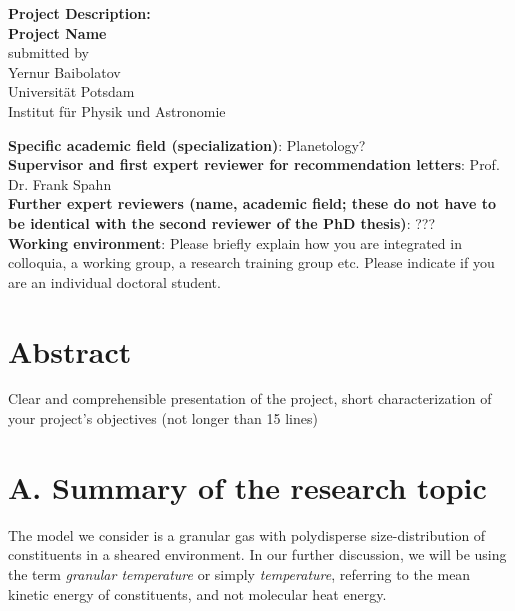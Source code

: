 \documentclass[11pt, notitlepage]{article} %
\begin{document}

\begin{center}
{\Large \textbf{Project Description:}}\\  
\vspace{.5cm}
{\LARGE\textbf{Project Name}} 
\\[.75cm] 
submitted by\\
{Yernur Baibolatov\\
Universit\"at Potsdam\\
Institut f\"ur Physik und Astronomie}
\end{center}
\noindent\textbf{Specific academic field (specialization)}: Planetology?
\\[.75cm] 
\textbf{Supervisor and first expert reviewer for recommendation letters}: Prof. Dr. Frank Spahn
\\[.75cm] 
\textbf{Further expert reviewers (name, academic field; these do not have to be identical with the second reviewer of the PhD thesis)}: ???
\\[.75cm] 
\textbf{Working environment}: Please  briefly  explain  how you  are  integrated  in  colloquia, a  working  group,   a  research  training group etc.  Please indicate if you are an individual doctoral student.

\section*{Abstract}
Clear  and  comprehensible  presentation  of  the  project,  short  characterization  of  your  project’s  objectives (not longer than 15 lines)



\newpage

\section*{A. Summary of the research topic}

The model we consider is a granular gas with polydisperse size-distribution 
of constituents in a sheared environment. In our further discussion, we will be 
using the term \emph{granular temperature} or simply \emph{temperature}, 
referring to the mean kinetic energy of constituents, and not molecular heat energy.
\end{document}
